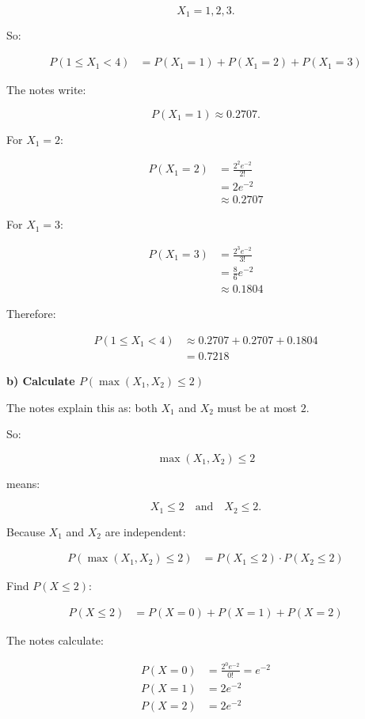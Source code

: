 \documentclass[10pt]{article}
\begin{document}
\[
X_1=1,2,3.
\]

So:

\begin{align*}
P(1\leq X_1<4)
&=
P(X_1=1)
+P(X_1=2)
+P(X_1=3)
\end{align*}

The notes write:

\[
P(X_1=1)\approx 0.2707.
\]

For $X_1=2$:

\begin{align*}
P(X_1=2)
&=
\frac{2^2e^{-2}}{2!} \\[2mm]
&=
2e^{-2} \\[2mm]
&\approx 0.2707
\end{align*}

For $X_1=3$:

\begin{align*}
P(X_1=3)
&=
\frac{2^3e^{-2}}{3!} \\[2mm]
&=
\frac{8}{6}e^{-2} \\[2mm]
&\approx 0.1804
\end{align*}

Therefore:

\begin{align*}
P(1\leq X_1<4)
&\approx
0.2707+0.2707+0.1804 \\[2mm]
&=0.7218
\end{align*}

\textbf{b) Calculate $P(\max(X_1,X_2)\leq 2)$}

The notes explain this as:
both $X_1$ and $X_2$ must be at most $2$.

So:

\[
\max(X_1,X_2)\leq 2
\]

means:

\[
X_1\leq 2
\quad \text{and}\quad
X_2\leq 2.
\]

Because $X_1$ and $X_2$ are independent:

\begin{align*}
P(\max(X_1,X_2)\leq 2)
&=
P(X_1\leq 2)\cdot P(X_2\leq 2)
\end{align*}

Find $P(X\leq 2)$:

\begin{align*}
P(X\leq 2)
&=
P(X=0)+P(X=1)+P(X=2)
\end{align*}

The notes calculate:

\begin{align*}
P(X=0)
&=
\frac{2^0e^{-2}}{0!}
=e^{-2} \\[2mm]
P(X=1)
&=
2e^{-2} \\[2mm]
P(X=2)
&=
2e^{-2}
\end{align*}
\end{document}
